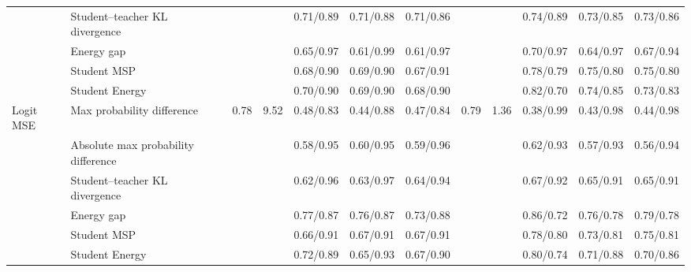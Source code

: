 \documentclass[border=2pt]{standalone}
\begin{document}
\begin{tabular}{llcccccccccc}
 & Student--teacher KL divergence &  &  & 0.71/0.89 & 0.71/0.88 & 0.71/0.86 &  &  & 0.74/0.89 & 0.73/0.85 & 0.73/0.86 \\
 & Energy gap &  &  & 0.65/0.97 & 0.61/0.99 & 0.61/0.97 &  &  & 0.70/0.97 & 0.64/0.97 & 0.67/0.94 \\
 & Student MSP &  &  & 0.68/0.90 & 0.69/0.90 & 0.67/0.91 &  &  & 0.78/0.79 & 0.75/0.80 & 0.75/0.80 \\
 & Student Energy &  &  & 0.70/0.90 & 0.69/0.90 & 0.68/0.90 &  &  & 0.82/0.70 & 0.74/0.85 & 0.73/0.83 \\
\addlinespace
Logit MSE & Max probability difference & 0.78 & 9.52 & 0.48/0.83 & 0.44/0.88 & 0.47/0.84 & 0.79 & 1.36 & 0.38/0.99 & 0.43/0.98 & 0.44/0.98 \\
 & Absolute max probability difference &  &  & 0.58/0.95 & 0.60/0.95 & 0.59/0.96 &  &  & 0.62/0.93 & 0.57/0.93 & 0.56/0.94 \\
 & Student--teacher KL divergence &  &  & 0.62/0.96 & 0.63/0.97 & 0.64/0.94 &  &  & 0.67/0.92 & 0.65/0.91 & 0.65/0.91 \\
 & Energy gap &  &  & 0.77/0.87 & 0.76/0.87 & 0.73/0.88 &  &  & 0.86/0.72 & 0.76/0.78 & 0.79/0.78 \\
 & Student MSP &  &  & 0.66/0.91 & 0.67/0.91 & 0.67/0.91 &  &  & 0.78/0.80 & 0.73/0.81 & 0.75/0.81 \\
 & Student Energy &  &  & 0.72/0.89 & 0.65/0.93 & 0.67/0.90 &  &  & 0.80/0.74 & 0.71/0.88 & 0.70/0.86 \\
\bottomrule
\end{tabular}
\end{document}
